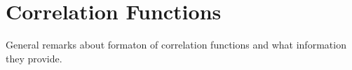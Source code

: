 \section{Correlation Functions}
\label{CorrelationFunctions}

General remarks about formaton of correlation functions and what information they provide.
